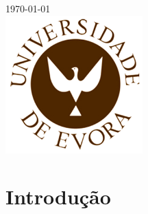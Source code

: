 \begin{titlepage}


{\large \today}\\[2cm] %


\includegraphics[scale=0.5]{uevora.png}\\[1cm] %
 

\vfill %

\end{titlepage}

\newpage
\thispagestyle{empty}
\renewcommand\contentsname{Índice}
\tableofcontents
\newpage
\renewcommand\listfigurename{Lista de Figuras}
\listoffigures
\newpage
{}

\printindex
\section{Introdução}

